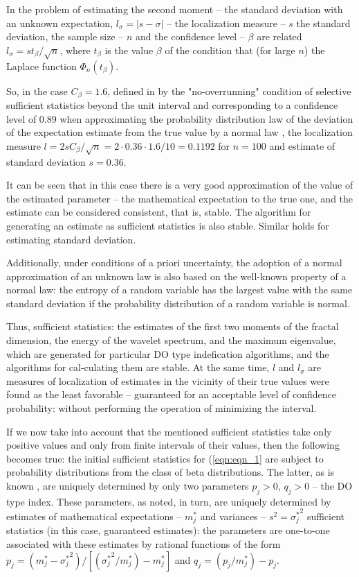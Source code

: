 In the problem of estimating the second moment -- the standard deviation with an unknown expectation, $l_{\sigma} = |s - \sigma|$ -- the localization measure -- $s$ the standard deviation, the sample size -- $n$ and the confidence level -- $\beta$ are related $l_{\sigma} = st_{\beta}/\sqrt{n}$, where $t_{\beta}$ is the value $\beta$ of the condition that (for large $n$) the Laplace function $\Phi_n(t_{\beta})$.

So, in the case $C_{\beta} = 1.6$, defined in \cite{bib_01} by the "no-overrunning" condition of selective sufficient statistics beyond the unit interval and corresponding to a confidence level of $0.89$ when approximating the probability distribution law of the deviation of the expectation estimate from the true value by a normal law \cite{bib_13}, the localization measure $l = 2sC_{\beta}/\sqrt{n} = 2 \cdot 0.36 \cdot 1.6 / 10 = 0.1192$ for $n = 100$ and estimate of standard deviation $s = 0.36$.
 
It can be seen that in this case there is a very good approximation of the value of the estimated parameter -- the mathematical expectation to the true one, and the estimate can be considered consistent, that is, stable.
The algorithm for generating an estimate as sufficient statistics is also stable.
Similar holds for estimating standard deviation.

Additionally, under conditions of a priori uncertainty, the adoption of a normal approximation of an unknown law is also based on the well-known \cite{bib_16} property of a normal law: the entropy of a random variable has the largest value with the same standard deviation if the probability distribution of a random variable is normal.

Thus, sufficient statistics: the estimates of the first two moments of the fractal dimension, the energy of the wavelet spectrum, and the maximum eigenvalue, which are generated for particular DO type indefication algorithms, and the algorithms for cal-culating them are stable.
At the same time, $l$ and $l_{\sigma}$ are measures of localization of estimates in the vicinity of their true values were found as the least favorable -- guaranteed for an acceptable level of confidence probability: without performing the operation of minimizing the interval.

If we now take into account \cite{bib_01} that the mentioned sufficient statistics take only positive values and only from finite intervals of their values, then the following becomes true: the initial sufficient statistics for (\ref{eqn:eqn_1} are subject to probability distributions from the class of beta distributions.
The latter, as is known \cite{bib_12}, are uniquely determined by only two parameters $p_j > 0$, $q_j > 0$ -- the DO type index.
These parameters, as noted, in turn, are uniquely determined by estimates of mathematical expectations -- $m_{j}^{*}$ and variances -- $s^2 = {\sigma_{j}^{*}}^2$ sufficient statistics (in this case, guaranteed estimates): the parameters are one-to-one associated with these estimates by rational functions of the form $p_j = (m_{j}^{*} - {\sigma_{j}^{*}}^2) / [({\sigma_{j}^{*}}^2 / m_{j}^{*}) - m_{j}^{*}]$ and $q_j = (p_j / m_{j}^{*}) - p_j$.


